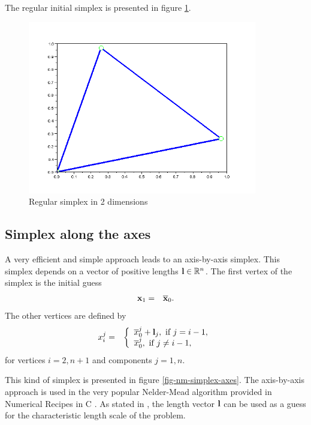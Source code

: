 The regular initial simplex is presented in figure \ref{fig-nm-simplex-regular}.

\begin{figure}
\begin{center}
\includegraphics[width=10cm]{simplex_regular.png}
\end{center}
\caption{Regular simplex in 2 dimensions}
\label{fig-nm-simplex-regular}
\end{figure}

\subsection{Simplex along the axes}

A very efficient and simple approach leads to an axis-by-axis simplex.
This simplex depends on a vector of positive lengths $\mathbf{l}\in\mathbb{R}^n$.
The first vertex of the simplex is the initial guess 
\begin{eqnarray}
\mathbf{x}_1 &=& \overline{\mathbf{x}}_0.
\end{eqnarray}
The other vertices are defined by 
\begin{eqnarray}
x_i^j &=& 
\left\{
\begin{array}{l}
\overline{x}_0^j + \mathbf{l}_j, \textrm{ if } j=i-1,\\
\overline{x}_0^j, \textrm{ if } j\neq i-1,\\
\end{array}
\right.
\end{eqnarray}
for vertices $i=2,n+1$ and components $j=1,n$.

This kind of simplex is presented in figure \ref{fig-nm-simplex-axes}.
The axis-by-axis approach is used in the very popular Nelder-Mead 
algorithm provided in Numerical Recipes in C \cite{NumericalRecipes}.
As stated in \cite{NumericalRecipes}, the length vector $\mathbf{l}$ can 
be used as a guess for the characteristic length scale of the problem.

